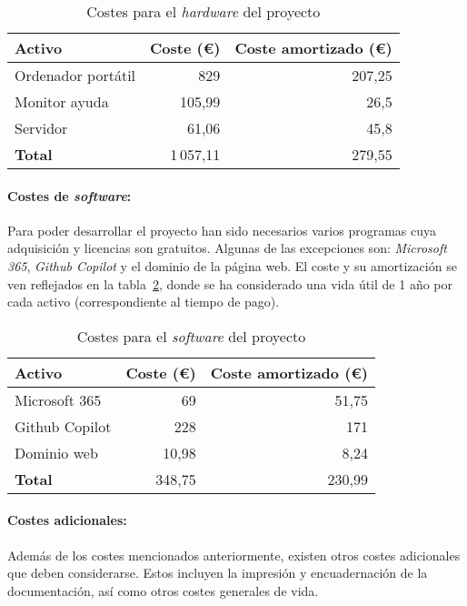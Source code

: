 \begin{table}[H]
	\centering
	\begin{tabular}{lrr}
		\toprule
		\textbf{Activo}      & \textbf{Coste (€)}      & \textbf{Coste amortizado (€)}      \\ \midrule
		Ordenador portátil     & 829                    & 207,25                      \\
		Monitor ayuda			& 105,99 						& 26,5							\\
		Servidor             & 61,06                    &  45,8                     \\ \midrule
		\textbf{Total}       & 1\,057,11                   & 279,55                      \\ \midrule
	\end{tabular}
	\caption{Costes para el \textit{hardware} del proyecto}
	\label{tabla:hw}
\end{table}

\paragraph{Costes de \textit{software}:} Para poder desarrollar el proyecto han sido necesarios varios programas cuya adquisición y licencias son gratuitos. Algunas de las excepciones son: \textit{Microsoft 365}, \textit{Github Copilot} y el dominio de la página web. El coste y su amortización se ven reflejados en la tabla~\ref{tabla:sw}, donde se ha considerado una vida útil de 1 año por cada activo (correspondiente al tiempo de pago).

\begin{table}[H]
	\centering
	\begin{tabular}{lrr}
		\toprule
		\textbf{Activo}      & \textbf{Coste (€)}      & \textbf{Coste amortizado (€)}      \\ \midrule
		Microsoft 365     & 69                    & 51,75                      \\
		Github Copilot			& 228 						& 171							\\
		Dominio web             & 10,98                    & 8,24                     \\ \midrule
		\textbf{Total}       & 348,75                   & 230,99                      \\ \midrule
	\end{tabular}
	\caption{Costes para el \textit{software} del proyecto}
	\label{tabla:sw}
\end{table}

\paragraph{Costes adicionales:} Además de los costes mencionados anteriormente, existen otros costes adicionales que deben considerarse. Estos incluyen la impresión y encuadernación de la documentación, así como otros costes generales de vida. 

